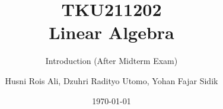 



\title{TKU211202 \\ Linear Algebra}
\subtitle{Introduction (After Midterm Exam)}
\author{Husni Rois Ali, Dzuhri Radityo Utomo, Yohan Fajar Sidik}
\date{\today}
\maketitle





